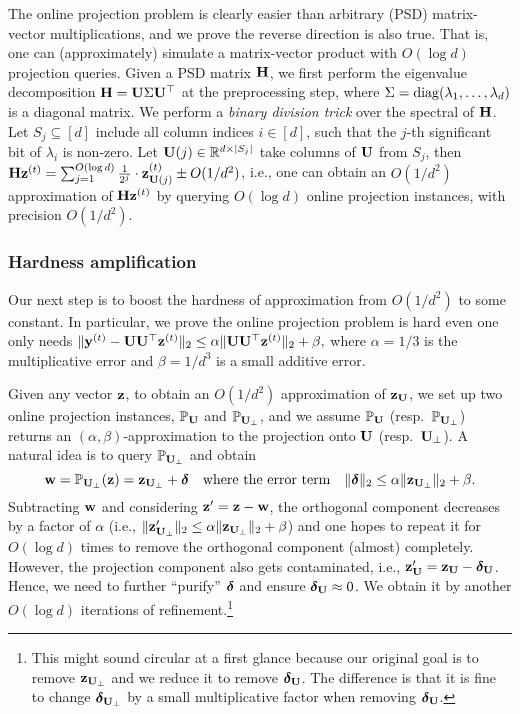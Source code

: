 The online projection problem is clearly easier than arbitrary (PSD) matrix-vector multiplications, and we prove the reverse direction is also true. That is, one can (approximately) simulate a matrix-vector product with $O(\log d)$ projection queries. Given a PSD matrix $\mathbf{H}$, we first perform the eigenvalue decomposition $\mathbf{H} = \mathbf{U} \Sigma \mathbf{U}^\top$ at the preprocessing step, where $\Sigma =\operatorname{diag}(\lambda_1, \ldots, \lambda_d)$ is a diagonal matrix. 
We perform a {\em binary division trick} over the spectral of $\mathbf{H}$. Let $S_j \subseteq [d]$ include all column indices $i\in [d]$, such that the $j$-th significant bit of $\lambda_{i}$ is non-zero. Let $\mathbf{U}(j) \in \mathbb{R}^{d\times |S_j|}$ take columns of $\mathbf{U}$ from $S_j$, then $\mathbf{H}\mathbf{z}^{(t)} = \sum_{j=1}^{O(\log d)}\frac{1}{2^j} \cdot \mathbf{z}_{\mathbf{U}(j)}^{(t)} \pm O(1/d^2)$, i.e., one can obtain an $O(1/d^2)$ approximation of $\mathbf{H}\mathbf{z}^{(t)}$ by querying $O(\log d)$ online projection instances, with precision $O(1/d^2)$.


\subsubsection{Hardness amplification} 
Our next step is to boost the hardness of approximation from $O(1/d^2)$ to some constant. In particular, we prove the online projection problem is hard even one only needs 
$
\|\mathbf{y}^{(t)} - \mathbf{U}\mathbf{U}^\top \mathbf{z}^{(t)}\|_2 \leq \alpha \|\mathbf{U}\mathbf{U}^\top \mathbf{z}^{(t)}\|_2 + \beta,
$
where $\alpha = 1/3$ is the multiplicative error and $\beta = 1/d^3$ is a small additive error.

Given any vector $\mathbf{z}$, to obtain an $O(1/d^2)$ approximation of $\mathbf{z}_{\mathbf{U}}$, we set up two online projection instances, $\mathbb{P}_{\mathbf{U}}$ and $\mathbb{P}_{\mathbf{U}_{\perp}}$, and we assume $\mathbb{P}_{\mathbf{U}}$ (resp.~$\mathbb{P}_{\mathbf{U}_\perp}$) returns an $(\alpha,\beta)$-approximation to the projection onto $\mathbf{U}$ (resp.~$\mathbf{U}_{\perp}$).
A natural idea is to query $\mathbb{P}_{\mathbf{U}_{\perp}}$ and obtain 
\[
\mathbf{w} = \mathbb{P}_{\mathbf{U}_{\perp}}(\mathbf{z}) = \mathbf{z}_{\mathbf{U}_\perp} + \boldsymbol\delta \quad \text{where the error term} \quad \|\boldsymbol\delta\|_2 \leq \alpha \|\mathbf{z}_{\mathbf{U}_{\perp}}\|_2  + \beta.
\]
Subtracting $\mathbf{w}$ and considering $\mathbf{z}' = \mathbf{z} - \mathbf{w}$, the orthogonal component decreases by a factor of $\alpha$ (i.e., $\|\mathbf{z}_{\mathbf{U}_\perp}'\|_2 \leq \alpha \|\mathbf{z}_{\mathbf{U}_\perp}\|_2 + \beta$) and one hopes to repeat it for $O(\log d)$ times to remove the orthogonal component (almost) completely. 
However, the projection component also gets contaminated, i.e., $\mathbf{z}_{\mathbf{U}}' = \mathbf{z}_{\mathbf{U}} - \boldsymbol\delta_{\mathbf{U}}$. Hence, we need to further ``purify'' $\boldsymbol\delta$ and ensure $\boldsymbol\delta_{\mathbf{U}} \approx 0$. 
We obtain it by another $O(\log d)$ iterations of refinement.\footnote{This might sound circular at a first glance because our original goal is to remove $\mathbf{z}_{\mathbf{U}_\perp}$ and we reduce it to remove $\boldsymbol\delta_{\mathbf{U}}$. The difference is that it is fine to change $\boldsymbol\delta_{\mathbf{U}_\perp}$ by a small multiplicative factor when removing $\boldsymbol\delta_{\mathbf{U}}$.}


